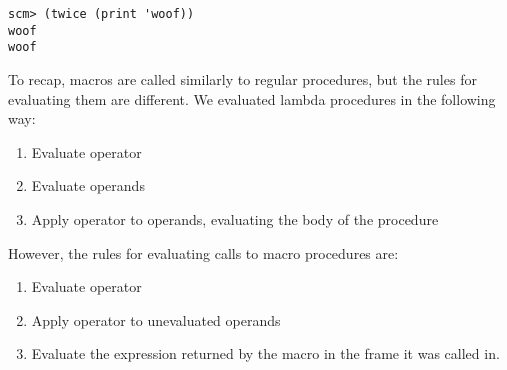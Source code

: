 \begin{lstlisting}
scm> (twice (print 'woof))
woof
woof
\end{lstlisting}

To recap, macros are called similarly to regular procedures, but the rules for
evaluating them are different. We evaluated lambda procedures in the following
way:

\begin{enumerate}[1.]
\item Evaluate operator
\item Evaluate operands
\item Apply operator to operands, evaluating the body of the procedure
\end{enumerate}

However, the rules for evaluating calls to macro procedures are:

\begin{enumerate}[1.]
\item Evaluate operator
\item Apply operator to unevaluated operands
\item Evaluate the expression returned by the macro in the frame it was called in.
\end{enumerate}

